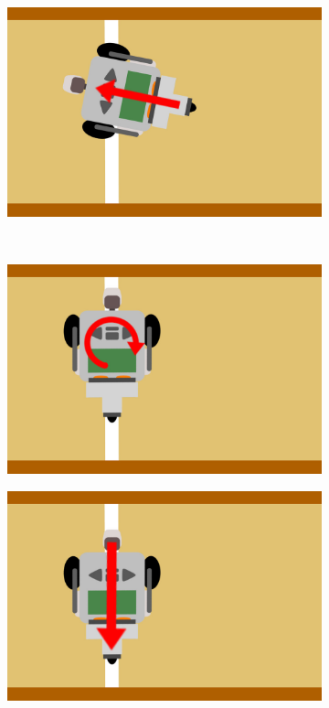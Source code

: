 \documentclass[eind]{penoverslag}
\begin{document}
\begin{figure}[h]
\begin{subfigure}[h]{0.24\textwidth}
		\caption{ }
		\label{fig:AlgoWit3}
	\end{subfigure}
	\begin{subfigure}[h]{0.24\textwidth}
		\includegraphics[width=\textwidth]{WitteLijn4}
		\caption{ }
		\label{fig:AlgoWit4}
	\end{subfigure}\\ \vspace{0.2cm}
	\begin{subfigure}[h]{0.24\textwidth}
		\includegraphics[width=\textwidth]{WitteLijn5}
		\caption{ }
		\label{fig:AlgoWit5}
	\end{subfigure}
	\begin{subfigure}[h]{0.24\textwidth}
		\includegraphics[width=\textwidth]{WitteLijn6}

\end{subfigure}
\end{figure}
\end{document}
